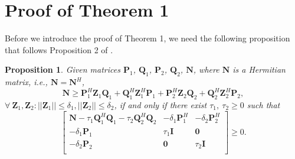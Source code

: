 \documentclass[review,sort&compress]{elsarticle}
\newtheorem{prop}{Proposition}
\renewcommand{\vec}[1]{\mbox{$\mathbf{#1}$}}
\newcommand{\norm}[1]{\left|\left|#1\right|\right|}
\newcommand{\vP}{\vec{P}}
\newcommand{\vI}{\vec{I}}
\newcommand{\vQ}{\vec{Q}}
\newcommand{\vN}{\vec{N}}
\newcommand{\vZ}{\vec{Z}}
\begin{document}
\appendix
\section{Proof of Theorem 1}\label{app:pot1}
Before we introduce the proof of Theorem 1, we need the following proposition that follows Proposition 2 of \cite{yonina1}.

\begin{prop}\label{prop1}
Given matrices $\vP_1$, $\vQ_1$, $\vP_2$, $\vQ_2$, $\vN$, where $\vN$ is a Hermitian matrix, i.e., $\vN = \vN^H$,
\[
\vN \geq \vP_1^H \vZ_1 \vQ_1 + \vQ_1^H \vZ_1^H \vP_1 + \vP_2^H \vZ_2 \vQ_2 + \vQ_2^H \vZ_2^H \vP_2,
\]
$\forall \: \vZ_1, \vZ_2 : \norm{\vZ_1} \leq \delta_1, \norm{\vZ_2} \leq \delta_2$, if and only if there exist $\tau_1, \: \tau_2 \geq 0$ such that
\begin{equation}\label{eq:prop}
    \begin{bmatrix}
    \vN - \tau_1 \vQ_1^H \vQ_1 - \tau_2 \vQ_2^H \vQ_2 &  -\delta_1 \vP_1^H & -\delta_2 \vP_2^H \\
    -\delta_1 \vP_1                                   & \tau_1\vI          & \vec{0} \\
    -\delta_2 \vP_2                                   & \vec{0}            & \tau_2 \vI\\
    \end{bmatrix} \geq 0.
\end{equation}
\end{prop}
\end{document}
